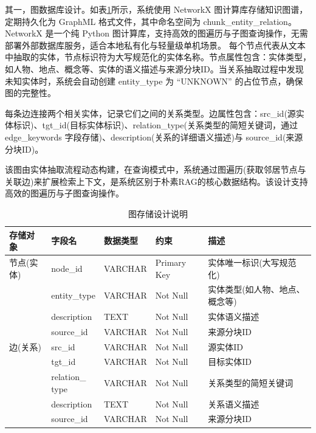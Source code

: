 \documentclass[promaster, vlined]{DissertUESTC}
\begin{document}
其一，图数据库设计。如表\ref{tab:graph_db}所示，系统使用 NetworkX 图计算库存储知识图谱，定期持久化为 GraphML 格式文件，其中命名空间为 chunk\_entity\_relation。NetworkX 是一个纯 Python 图计算库，支持高效的图遍历与子图查询操作，无需部署外部数据库服务，适合本地私有化与轻量级单机场景。
每个节点代表从文本中抽取的实体，节点标识符为大写规范化的实体名称。节点属性包含：实体类型，如人物、地点、概念等、实体的语义描述与来源分块ID。当关系抽取过程中发现未知实体时，系统会自动创建 entity\_type 为 “UNKNOWN” 的占位节点，确保图的完整性。

每条边连接两个相关实体，记录它们之间的关系类型。边属性包含：src\_id(源实体标识)、tgt\_id(目标实体标识)、relation\_type(关系类型的简短关键词，通过 edge\_keywords 字段存储)、description(关系的详细语义描述)与 source\_id(来源分块ID)。

该图由实体抽取流程动态构建，在查询模式中，系统通过图遍历(获取邻居节点与关联边)来扩展检索上下文，是系统区别于朴素RAG的核心数据结构。该设计支持高效的图遍历与子图查询操作。

\begin{table}[!ht]
\caption{图存储设计说明}
\centering
\setlength{\tabcolsep}{2pt}
\begin{tabular}{@{}>{\raggedright\arraybackslash}p{1.6cm}>{\raggedright\arraybackslash}p{1.8cm}>{\raggedright\arraybackslash}p{1.9cm}>{\raggedright\arraybackslash}p{1.9cm}>{\raggedright\arraybackslash}p{4.4cm}@{}}
\toprule
存储对象 & 字段名 & 数据类型 & 约束 & 描述 \\
\midrule
节点(实体) & node\_id        & VARCHAR  & Primary Key & 实体唯一标识(大写规范化) \\
             & entity\_type    & VARCHAR  & Not Null    & 实体类型(如人物、地点、概念等) \\
             & description     & TEXT     & Not Null    & 实体语义描述 \\
             & source\_id      & VARCHAR  & Not Null    & 来源分块ID \\
\midrule
边(关系)   & src\_id         & VARCHAR  & Not Null    & 源实体ID \\
             & tgt\_id         & VARCHAR  & Not Null    & 目标实体ID \\
             & \shortstack[l]{relation\_\\type}  & VARCHAR  & Not Null    & 关系类型的简短关键词 \\
             & description     & TEXT     & Not Null    & 关系语义描述 \\
             & source\_id      & VARCHAR  & Not Null    & 来源分块ID \\
\bottomrule
\end{tabular}
\label{tab:graph_db}
\end{table}
\end{document}
